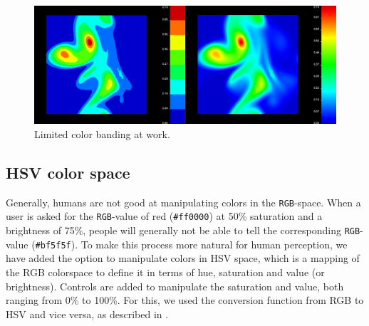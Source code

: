 		\begin{figure}[htb]
			  \centering
			  \includegraphics[width=\linewidth]{./content/pictures/limit_colors.png}
			  \caption{Limited color banding at work.}
			  \label{fig:banded_difference}
		\end{figure}

	\subsection{HSV color space}
		Generally, humans are not good at manipulating colors in the \texttt{RGB}-space. 
		When a user is asked for the \texttt{RGB}-value of red (\texttt{\#ff0000}) at 50\% saturation and a brightness of 75\%, people will generally not be able to tell the corresponding \texttt{RGB}-value (\texttt{\#bf5f5f}).
		To make this process more natural for human perception, we have added the option to manipulate colors in HSV space, which is a mapping of the RGB colorspace to define it in terms of hue, saturation and value (or brightness).
		Controls are added to manipulate the saturation and value, both ranging from 0\% to 100\%.
		For this, we used the conversion function from RGB to HSV and vice versa, as described in \cite{telea2014data}.

